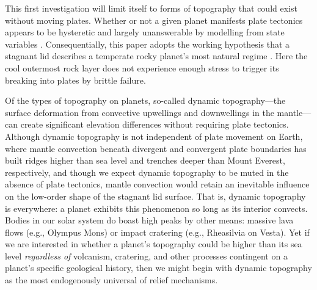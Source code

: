 


This first investigation will limit itself to forms of topography that could exist without moving plates. Whether or not a given planet manifests plate tectonics appears to be hysteretic and largely unanswerable by modelling from state variables \citep{lenardic_notion_2012, weller_evolution_2018, lenardic_diversity_2018}. Consequentially, this paper adopts the working hypothesis that a stagnant lid describes a temperate rocky planet's most natural regime \citep{stern_stagnant_2018}. Here the cool outermost rock layer does not experience enough stress to trigger its breaking into plates by brittle failure.


Of the types of topography on planets, so-called dynamic topography---the surface deformation from convective upwellings and downwellings in the mantle---can create significant elevation differences without requiring plate tectonics. Although dynamic topography is not independent of plate movement on Earth, where mantle convection beneath divergent and convergent plate boundaries has built ridges higher than sea level and trenches deeper than Mount Everest, respectively, and though we expect dynamic topography to be muted in the absence of plate tectonics, mantle convection would retain an inevitable influence on the low-order shape of the stagnant lid surface. That is, dynamic topography is everywhere: a planet exhibits this phenomenon so long as its interior convects. Bodies in our solar system do boast high peaks by other means: massive lava flows (e.g., Olympus Mons) or impact cratering (e.g., Rheasilvia on Vesta). Yet if we are interested in whether a planet's topography could be higher than its sea level \emph{regardless of} volcanism, cratering, and other processes contingent on a planet's specific geological history, then we might begin with dynamic topography as the most endogenously universal of relief mechanisms. 


